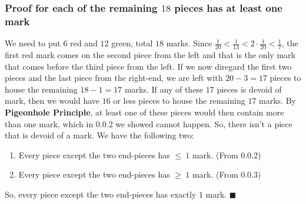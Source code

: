\documentclass{article}
\begin{document}
\subsubsection{Proof for each of the remaining $18$ pieces has at least one mark}
We need to put $6$ red and $12$ green, total $18$ marks. Since $\frac{1}{20} < \frac{1}{13} < 2 \cdot \frac{1}{20} < \frac{1}{7}$, the first red mark comes on the second piece from the left and that is the only mark that comes before the third piece from the left. If we now diregard the first two pieces and the last piece from the right-end, we are left with $20-3 = 17$ pieces to house the remaining $18-1=17$ marks. If any of these $17$ pieces is devoid of mark, then we would have $16$ or less pieces to house the remaining $17$ marks. By \textbf{Pigeonhole Principle}, at least one of these pieces would then contain more than one mark, which in $0.0.2$ we showed cannot happen. So, there isn't a piece that is devoid of a mark. We have the following two:
\begin{enumerate}
\item Every piece except the two end-pieces has $\leq\ 1$ mark. (From $0.0.2$)
\item Every piece except the two end-pieces has $\geq\ 1$ mark. (From $0.0.3$)
\end{enumerate}
So, every piece except the two end-pieces has exactly $1$ mark.  $\blacksquare$
\end{document}
